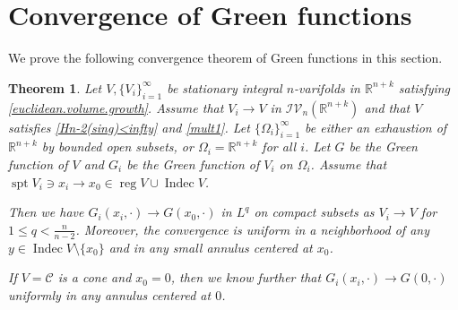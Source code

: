 \documentclass[11pt]{amsart}
\newtheorem{theorem}{Theorem}[section]
\theoremstyle{definition}
\newcommand{\R}{\mathbb{R}}
\newcommand{\C}{\mathcal{C}}
\newcommand{\IV}{\mathcal{IV}}
\DeclareMathOperator{\spt}{spt}
\DeclareMathOperator{\reg}{reg}
\DeclareMathOperator{\indec}{Indec}
\begin{document}
\section{Convergence of Green functions}\label{convergence.of.green.function}
We prove the following convergence theorem of Green functions in this section.
\begin{theorem}\label{conv1}
	Let $V,\{V_i\}_{i=1}^\infty$ be stationary integral $n$-varifolds in $\R^{n+k}$ satisfying \eqref{euclidean.volume.growth}. Assume that $V_i \to V$ in $\IV_n(\R^{n+k})$ and that $V$ satisfies \eqref{Hn-2(sing)<infty} and \eqref{mult1}. Let $\{\Omega_i\}_{i=1}^\infty$ be either an exhaustion of $\R^{n+k}$ by bounded open subsets, or $\Omega_i = \R^{n+k}$ for all $i$. Let $G$ be the Green function of $V$ and $G_i$ be the Green function of $V_i$ on $\Omega_i$. Assume that $\spt V_i\ni x_i\to x_0\in \reg V\cup \indec V$. 
    
    Then we have $G_i(x_i,\cdot)\to G(x_0,\cdot)$ in $L^q$ on compact subsets as $V_i\to V$ for $1\le q<\frac{n}{n-2}$. Moreover, the convergence is uniform in a neighborhood of any $y\in \indec V\setminus \{x_0\}$ and in any small annulus centered at $x_0$.
    
    If $V=\C$ is a cone and $x_0=0$, then we know further that $G_i(x_i,\cdot)\to G(0,\cdot)$ uniformly in any annulus centered at $0$.
\end{theorem}
\end{document}
